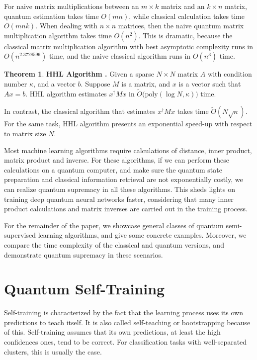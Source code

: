 \documentclass[11pt]{article}
\theoremstyle{definition}
\newtheorem{theorem}{Theorem}[section]
\begin{document}
For naive matrix multiplications between an $m \times k$ matrix and an $k \times n$ matrix, quantum estimation takes time $O(m n)$, while classical calculation takes time $O(m n k)$. When dealing with $n \times n$ matrices, then the naive quantum matrix multiplication algorithm takes time $O(n^2)$. 
This is dramatic, because the classical matrix multiplication algorithm with best asymptotic complexity runs in $O(n^{2.3728596})$ time, and the naive classical algorithm runs in $O(n^3)$ time.




\begin{theorem}
\textbf{HHL Algorithm \cite{hhl}.}
Given a sparse $N \times N$ matrix $A$ with condition number $\kappa$, and a vector $b$. Suppose $M$ is a matrix, and $x$ is a vector such that $A x = b$. HHL algorithm estimates $x^{\dagger} M x$ in $\tilde{O} \big(\text{poly}(\log N, \kappa) \big)$ time.


In contrast, the classical algorithm that estimates $x^{\dagger} M x$ takes time $\tilde{O}(N \sqrt{\kappa})$. For the same task, HHL algorithm presents an exponential speed-up with respect to matrix size $N$.
\end{theorem}

Most machine learning algorithms require calculations of distance, inner product, matrix product and inverse. For these algorithms, if we can perform these calculations on a quantum computer, and make sure the quantum state preparation and classical information retrieval are not exponentially costly, we can realize quantum supremacy in all these algorithms. This sheds lights on training deep quantum neural networks faster, considering that many inner product calculations and matrix inverses are carried out in the training process.

For the remainder of the paper, we showcase general classes of quantum semi-supervised learning algorithms, and give some concrete examples. Moreover, we compare the time complexity of the classical and quantum versions, and demonstrate quantum supremacy in these scenarios.


\section{Quantum Self-Training}
\label{self}

Self-training is characterized by the fact that the learning process uses its own predictions to teach itself. It is also called self-teaching or bootstrapping because of this. Self-training assumes that its own predictions, at least the high confidences ones, tend to be correct. For classification tasks with well-separated clusters, this is usually the case.
\end{document}

